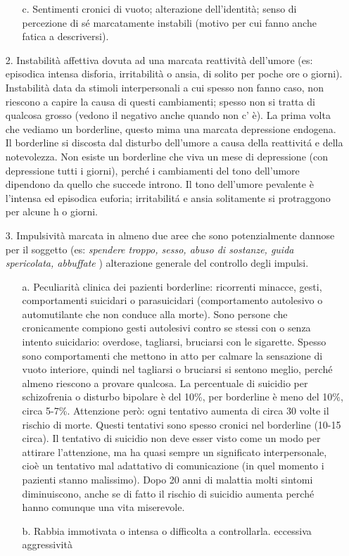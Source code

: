 \begin{itemize}
\begin{itemize}
\item[c.]
  Sentimenti cronici di vuoto; alterazione dell'identità; senso di
  percezione di sé marcatamente instabili (motivo per cui fanno anche
  fatica a descriversi).
\end{itemize}

\item[2.]
  Instabilità affettiva dovuta ad una marcata reattività dell'umore (es:
  episodica intensa disforia, irritabilità o ansia, di solito per poche
  ore o giorni). Instabilità data da stimoli interpersonali a cui spesso
  non fanno caso, non riescono a capire la causa di questi cambiamenti;
  spesso non si tratta di qualcosa grosso (vedono il negativo anche
  quando non c' è). La prima volta che vediamo un borderline, questo
  mima una marcata depressione endogena. Il borderline si discosta dal
  disturbo dell'umore a causa della reattivitá e della notevolezza. Non
  esiste un borderline che viva un mese di depressione (con depressione
  tutti i giorni), perché i cambiamenti del tono dell'umore dipendono da
  quello che succede introno. Il tono dell'umore pevalente è l'intensa
  ed episodica euforia; irritabilitá e ansia solitamente si protraggono
  per alcune h o giorni.
  
\item[3.]
  Impulsività marcata in almeno due aree che sono potenzialmente dannose
  per il soggetto (es: \emph{spendere troppo, sesso, abuso di sostanze,
  guida spericolata, abbuffate} ) alterazione generale del controllo
  degli impulsi.
 
\begin{itemize}

\item[a.]
  Peculiarità clinica dei pazienti borderline: ricorrenti minacce,
  gesti, comportamenti suicidari o parasuicidari (comportamento
  autolesivo o automutilante che non conduce alla morte). Sono persone
  che cronicamente compiono gesti autolesivi contro se stessi con o
  senza intento suicidario: overdose, tagliarsi, bruciarsi con le
  sigarette. Spesso sono comportamenti che mettono in atto per calmare
  la sensazione di vuoto interiore, quindi nel tagliarsi o bruciarsi si
  sentono meglio, perché almeno riescono a provare qualcosa. La
  percentuale di suicidio per schizofrenia o disturbo bipolare è del
  10\%, per borderline è meno del 10\%, circa 5-7\%. Attenzione però:
  ogni tentativo aumenta di circa 30 volte il rischio di morte. Questi
  tentativi sono spesso cronici nel borderline (10-15 circa). Il
  tentativo di suicidio non deve esser visto come un modo per attirare
  l'attenzione, ma ha quasi sempre un significato interpersonale, cioè
  un tentativo mal adattativo di comunicazione (in quel momento i
  pazienti stanno malissimo). Dopo 20 anni di malattia molti sintomi
  diminuiscono, anche se di fatto il rischio di suicidio aumenta perché
  hanno comunque una vita miserevole.
\item[b.]
  Rabbia immotivata o intensa o difficolta a controllarla. eccessiva
  aggressività
\end{itemize}
\end{itemize}

